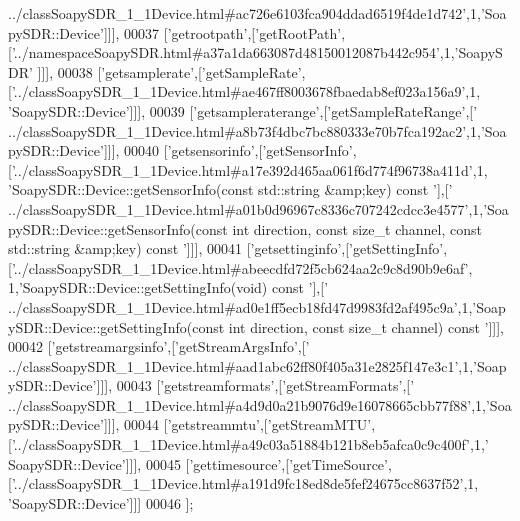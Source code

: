 \begin{DoxyCode}
{      ../classSoapySDR\_1\_1Device.html#ac726e6103fca904ddad6519f4de1d742'},1,\textcolor{stringliteral}{'SoapySDR::Device'}]]],
00037   [\textcolor{stringliteral}{'getrootpath'},[\textcolor{stringliteral}{'getRootPath'},[\textcolor{stringliteral}{'../namespaceSoapySDR.html#a37a1da663087d48150012087b442c954'},1,\textcolor{stringliteral}{'SoapySDR'}
      ]]],
00038   [\textcolor{stringliteral}{'getsamplerate'},[\textcolor{stringliteral}{'getSampleRate'},[\textcolor{stringliteral}{'../classSoapySDR\_1\_1Device.html#ae467ff8003678fbaedab8ef023a156a9'},1,\textcolor{stringliteral}{
      'SoapySDR::Device'}]]],
00039   [\textcolor{stringliteral}{'getsampleraterange'},[\textcolor{stringliteral}{'getSampleRateRange'},[\textcolor{stringliteral}{'
      ../classSoapySDR\_1\_1Device.html#a8b73f4dbc7bc880333e70b7fca192ac2'},1,\textcolor{stringliteral}{'SoapySDR::Device'}]]],
00040   [\textcolor{stringliteral}{'getsensorinfo'},[\textcolor{stringliteral}{'getSensorInfo'},[\textcolor{stringliteral}{'../classSoapySDR\_1\_1Device.html#a17e392d465aa061f6d774f96738a411d'},1,\textcolor{stringliteral}{
      'SoapySDR::Device::getSensorInfo(const std::string &amp;key) const '}],[\textcolor{stringliteral}{'
      ../classSoapySDR\_1\_1Device.html#a01b0d96967c8336c707242cdcc3e4577'},1,\textcolor{stringliteral}{'SoapySDR::Device::getSensorInfo(const int direction, const size\_t channel,
       const std::string &amp;key) const '}]]],
00041   [\textcolor{stringliteral}{'getsettinginfo'},[\textcolor{stringliteral}{'getSettingInfo'},[\textcolor{stringliteral}{'../classSoapySDR\_1\_1Device.html#abeecdfd72f5cb624aa2c9c8d90b9e6af'},
      1,\textcolor{stringliteral}{'SoapySDR::Device::getSettingInfo(void) const '}],[\textcolor{stringliteral}{'
      ../classSoapySDR\_1\_1Device.html#ad0e1ff5ecb18fd47d9983fd2af495c9a'},1,\textcolor{stringliteral}{'SoapySDR::Device::getSettingInfo(const int direction, const size\_t channel) const '}]]],
00042   [\textcolor{stringliteral}{'getstreamargsinfo'},[\textcolor{stringliteral}{'getStreamArgsInfo'},[\textcolor{stringliteral}{'
      ../classSoapySDR\_1\_1Device.html#aad1abc62ff80f405a31e2825f147e3c1'},1,\textcolor{stringliteral}{'SoapySDR::Device'}]]],
00043   [\textcolor{stringliteral}{'getstreamformats'},[\textcolor{stringliteral}{'getStreamFormats'},[\textcolor{stringliteral}{'
      ../classSoapySDR\_1\_1Device.html#a4d9d0a21b9076d9e16078665cbb77f88'},1,\textcolor{stringliteral}{'SoapySDR::Device'}]]],
00044   [\textcolor{stringliteral}{'getstreammtu'},[\textcolor{stringliteral}{'getStreamMTU'},[\textcolor{stringliteral}{'../classSoapySDR\_1\_1Device.html#a49c03a51884b121b8eb5afca0c9c400f'},1,\textcolor{stringliteral}{'
      SoapySDR::Device'}]]],
00045   [\textcolor{stringliteral}{'gettimesource'},[\textcolor{stringliteral}{'getTimeSource'},[\textcolor{stringliteral}{'../classSoapySDR\_1\_1Device.html#a191d9fc18ed8de5fef24675cc8637f52'},1,\textcolor{stringliteral}{
      'SoapySDR::Device'}]]]
00046 ];
\end{DoxyCode}
